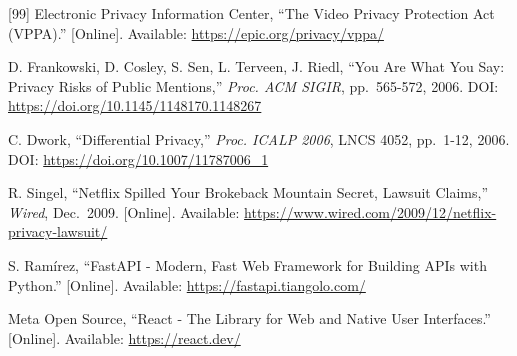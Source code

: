 \documentclass[a4paper,12pt,oneside]{book}
\renewcommand{\_}{\textunderscore\allowbreak}
\begin{document}
\begin{thebibliography}{[99]}
 Electronic Privacy Information Center, ``The Video Privacy Protection Act (VPPA).'' [Online]. Available: \url{https://epic.org/privacy/vppa/}

 D. Frankowski, D. Cosley, S. Sen, L. Terveen, J. Riedl, ``You Are What You Say: Privacy Risks of Public Mentions,'' \textit{Proc. ACM SIGIR}, pp.~565-572, 2006. DOI: \url{https://doi.org/10.1145/1148170.1148267}

 C. Dwork, ``Differential Privacy,'' \textit{Proc. ICALP 2006}, LNCS 4052, pp.~1-12, 2006. DOI: \url{https://doi.org/10.1007/11787006_1}

 R. Singel, ``Netflix Spilled Your Brokeback Mountain Secret, Lawsuit Claims,'' \textit{Wired}, Dec.~2009. [Online]. Available: \url{https://www.wired.com/2009/12/netflix-privacy-lawsuit/}

 S. Ram\'irez, ``FastAPI - Modern, Fast Web Framework for Building APIs with Python.'' [Online]. Available: \url{https://fastapi.tiangolo.com/}

 Meta Open Source, ``React - The Library for Web and Native User Interfaces.'' [Online]. Available: \url{https://react.dev/}

\end{thebibliography}

\newpage

\end{document}
